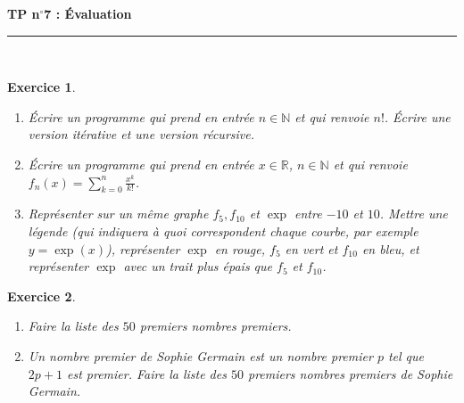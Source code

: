 \documentclass[11pt,a4paper]{article}
\title{}
\date{}
\newtheorem{ex}{Exercice}
\newcommand{\HRule}{\rule{\linewidth}{0.5mm}}
\begin{document}
\pagestyle{fancy}

\fancyhead{}
 \fancyfoot{}


\newcommand{\lb}{\llbracket}
\newcommand{\rb}{\rrbracket}

\newcommand{\md}[3]{#1 \equiv #2 \! \! \! \! \! \pmod {#3} }
\newcommand{\nmd}[3]{#1 \not \equiv #2 \! \! \! \! \!  \pmod #3 }
\newcommand{\mda}[3]{#1 \equiv #2 \! \!  \pmod #3 }
\newcommand{\nmda}[3]{#1 \not \equiv #2 \! \! \pmod #3 }
\newcommand{\mo}[2]{#1 \! \! \! \! \! \pmod #2 }
\newcommand{\N}{\mathbb{N}}
\newcommand{\Z}{\mathbb{Z}}
\newcommand{\R}{\mathbb{R}}


\thispagestyle{fancy}

\begin{center}
    { \huge \bfseries
    TP n$^{\boldsymbol{\circ}}$7 : Évaluation
     \\ [0cm] }
    \HRule \\[0.5cm]
\end{center}


\begin{ex}
\begin{enumerate}
\item Écrire un programme qui prend en entrée $n\in \N$ et qui renvoie $n!$. Écrire une version itérative et une version récursive.

\item Écrire un programme qui prend en entrée $x\in \R$, $n\in \N$ et qui renvoie $f_n(x)=\sum_{k=0}^n \frac{x^k}{k!}$. 

\item Représenter sur un même graphe $f_5, f_{10}$ et $\exp$ entre $-10$ et $10$. Mettre une légende (qui indiquera à quoi correspondent chaque courbe, par exemple $y=\exp(x)$), représenter $\exp$ en rouge, $f_5$ en vert et $f_{10}$ en bleu, et représenter $\exp$ avec un trait plus épais que $f_5$ et $f_{10}$.

\end{enumerate}
\end{ex}


\begin{ex}
\begin{enumerate}


\item Faire la liste des $50$ premiers  nombres premiers.

\item Un nombre premier de Sophie Germain est un nombre premier $p$ tel que $2p+1$ est premier. Faire la liste des $50$ premiers nombres premiers de Sophie Germain.
\end{enumerate}

\end{ex}
\end{document}
